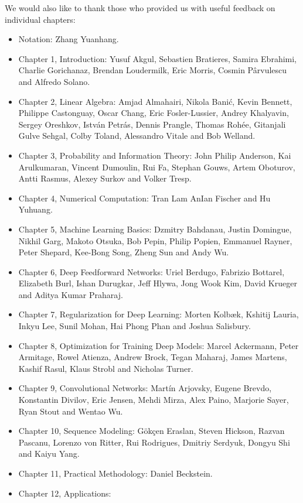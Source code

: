 We would also like to thank those who provided us with useful feedback on individual chapters:

\begin{itemize}
\item Notation: Zhang Yuanhang.
\item  
Chapter 1, Introduction:
Yusuf Akgul, Sebastien Bratieres, Samira Ebrahimi, Charlie Gorichanaz, Brendan Loudermilk, Eric Morris, Cosmin Pârvulescu and Alfredo Solano.
\item  Chapter 2,  Linear Algebra:
Amjad Almahairi, Nikola Bani\'{c}, Kevin Bennett, Philippe Castonguay, Oscar Chang, Eric Fosler-Lussier, Andrey Khalyavin, Sergey Oreshkov, Istv\'an Petr\'as, Dennis Prangle, Thomas Roh\'ee, Gitanjali Gulve Sehgal, Colby Toland, Alessandro Vitale and Bob Welland.
\item Chapter 3, Probability and Information Theory:
John Philip Anderson, Kai Arulkumaran, Vincent Dumoulin, Rui Fa, Stephan Gouws, Artem Oboturov, Antti Rasmus, Alexey Surkov and Volker Tresp.
\item Chapter 4, Numerical Computation:
Tran Lam AnIan Fischer and Hu Yuhuang.
\item  Chapter 5,  Machine Learning Basics:
Dzmitry Bahdanau, Justin Domingue, Nikhil Garg, Makoto Otsuka, Bob Pepin, Philip Popien, Emmanuel Rayner, Peter Shepard, Kee-Bong Song, Zheng Sun and Andy Wu.
\item Chapter 6,  Deep Feedforward Networks: 
Uriel Berdugo, Fabrizio Bottarel, Elizabeth Burl, Ishan Durugkar, Jeff Hlywa, Jong Wook Kim, David Krueger and Aditya Kumar Praharaj.
\item Chapter 7, Regularization for Deep Learning:
Morten Kolbæk, Kshitij Lauria, Inkyu Lee, Sunil Mohan, Hai Phong Phan and Joshua Salisbury.
\item Chapter 8, Optimization for Training Deep Models:
Marcel Ackermann, Peter Armitage, Rowel Atienza, Andrew Brock, Tegan Maharaj, James Martens, Kashif Rasul, Klaus Strobl and Nicholas Turner.
\item Chapter 9, Convolutional Networks: 
Mart\'in Arjovsky, Eugene Brevdo, Konstantin Divilov, Eric Jensen, Mehdi Mirza, Alex Paino, Marjorie Sayer, Ryan Stout and Wentao Wu.
\item Chapter 10, Sequence Modeling:
Gökçen Eraslan, Steven Hickson, Razvan Pascanu, Lorenzo von Ritter, Rui Rodrigues, Dmitriy Serdyuk, Dongyu Shi and Kaiyu Yang.
\item Chapter 11,  Practical Methodology:
Daniel Beckstein.
\item Chapter 12,  Applications: 

\end{itemize}
